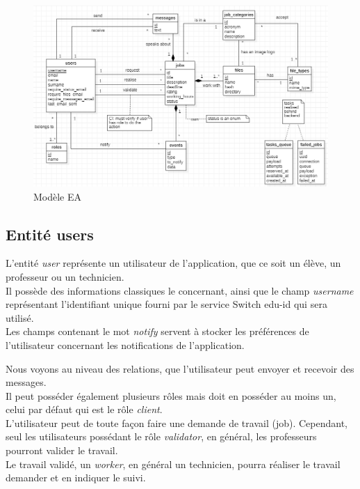 \documentclass[
    iai, %
    il, %
]{heig-tb}
\begin{document}
\begin{center}
    \begin{figure}[H]
        \includegraphics[width=\textwidth]{./assets/figures/ea.png}
        \caption{Modèle EA \label{ea}}
    \end{figure}
\end{center}

\subsection{Entité users}
L'entité \emph{user} représente un utilisateur de l'application, que ce soit un élève, un professeur ou un technicien.\\
Il possède des informations classiques le concernant, ainsi que le champ \emph{username} représentant l'identifiant unique fourni par le service Switch edu-id qui sera utilisé.\\
Les champs contenant le mot \emph{notify} servent à stocker les préférences de l'utilisateur concernant les notifications de l'application.

Nous voyons au niveau des relations, que l'utilisateur peut envoyer et recevoir des messages.\\
Il peut posséder également plusieurs rôles mais doit en posséder au moins un, celui par défaut qui est le rôle \emph{client}.\\
L'utilisateur peut de toute façon faire une demande de travail (job). Cependant, seul les utilisateurs possédant le rôle \emph{validator}, en général, les professeurs pourront valider le travail.\\
Le travail validé, un \emph{worker}, en général un technicien, pourra réaliser le travail demander et en indiquer le suivi.
\end{document}
